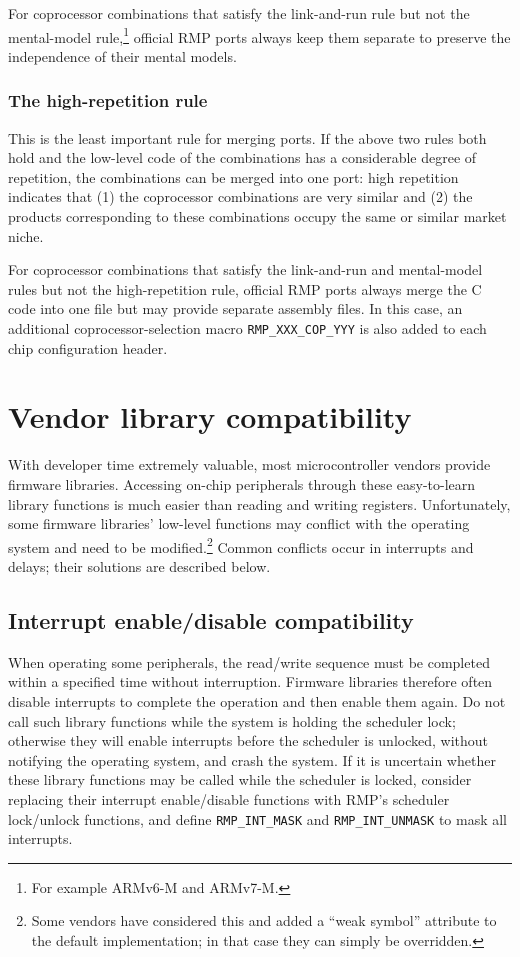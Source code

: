 For coprocessor combinations that satisfy the link-and-run rule but not the mental-model rule,\footnote{For example ARMv6-M and ARMv7-M.} official RMP ports always keep them separate to preserve the independence of their mental models.

\subsubsection{The high-repetition rule}

This is the least important rule for merging ports.
If the above two rules both hold and the low-level code of the combinations has a considerable degree of repetition, the combinations can be merged into one port: high repetition indicates that (1) the coprocessor combinations are very similar and (2) the products corresponding to these combinations occupy the same or similar market niche.

For coprocessor combinations that satisfy the link-and-run and mental-model rules but not the high-repetition rule, official RMP ports always merge the C code into one file but may provide separate assembly files.
In this case, an additional coprocessor-selection macro \texttt{RMP\_XXX\_COP\_YYY} is also added to each chip configuration header.

\section{Vendor library compatibility}

With developer time extremely valuable, most microcontroller vendors provide firmware libraries.
Accessing on-chip peripherals through these easy-to-learn library functions is much easier than reading and writing registers.
Unfortunately, some firmware libraries' low-level functions may conflict with the operating system and need to be modified.\footnote{Some vendors have considered this and added a ``weak symbol'' attribute to the default implementation; in that case they can simply be overridden.}
Common conflicts occur in interrupts and delays; their solutions are described below.

\subsection{Interrupt enable/disable compatibility}

When operating some peripherals, the read/write sequence must be completed within a specified time without interruption.
Firmware libraries therefore often disable interrupts to complete the operation and then enable them again.
Do not call such library functions while the system is holding the scheduler lock; otherwise they will enable interrupts before the scheduler is unlocked, without notifying the operating system, and crash the system.
If it is uncertain whether these library functions may be called while the scheduler is locked, consider replacing their interrupt enable/disable functions with RMP's scheduler lock/unlock functions, and define \texttt{RMP\_INT\_MASK} and \texttt{RMP\_INT\_UNMASK} to mask all interrupts.

